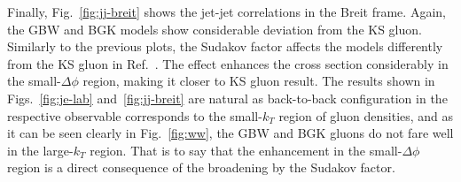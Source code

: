 \documentclass[11pt]{article}
\numberwithin{equation}{section}
\numberwithin{table}{section}
\numberwithin{figure}{section}
\begin{document}
Finally, Fig.~\ref{fig:jj-breit} shows the jet-jet correlations in the Breit frame. Again, the GBW and BGK models show considerable deviation from the KS gluon. Similarly to the previous plots, the Sudakov factor affects the models differently from the KS gluon in Ref.~\cite{vanHameren:2021sqc}.
The effect enhances the cross section considerably in the small-$\Delta\phi$ region, making it closer to KS gluon result.
The results shown in Figs.~\ref{fig:je-lab} and~\ref{fig:jj-breit} are natural as back-to-back configuration in the respective observable corresponds to the small-$k_T$ region of gluon densities, and as it can be seen clearly in Fig.~\ref{fig:ww}, the GBW and BGK gluons do not fare well in the large-$k_T$ region. 
That is to say that the enhancement in the small-$\Delta\phi$ region is a direct consequence of the broadening by the Sudakov factor. 
\end{document}
